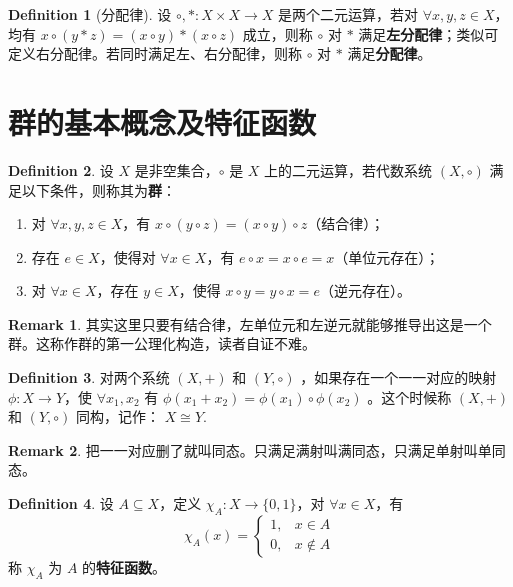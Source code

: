 \documentclass[oneside]{book}
\theoremstyle{definition}
\newtheorem{definition}{Definition}[section]
\newtheorem{remark}{Remark}[section]
\begin{document}
	\begin{definition}[分配律]
		设 \( \circ, *: X \times X \to X \) 是两个二元运算，若对 \( \forall x, y, z \in X \)，均有 \( x \circ (y * z) = (x \circ y) * (x \circ z) \) 成立，则称 \( \circ \) 对 \( * \) 满足\textbf{左分配律}；类似可定义右分配律。若同时满足左、右分配律，则称 \( \circ \) 对 \( * \) 满足\textbf{分配律}。
	\end{definition}
	
	\section{群的基本概念及特征函数}
	
	\begin{definition}
		设 \( X \) 是非空集合，\( \circ \) 是 \( X \) 上的二元运算，若代数系统 \( (X, \circ) \) 满足以下条件，则称其为\textbf{群}：
		\begin{enumerate}
			\item 对 \( \forall x, y, z \in X \)，有 \( x \circ (y \circ z) = (x \circ y) \circ z \)（结合律）；
			\item 存在 \( e \in X \)，使得对 \( \forall x \in X \)，有 \( e \circ x = x \circ e = x \)（单位元存在）；
			\item 对 \( \forall x \in X \)，存在 \( y \in X \)，使得 \( x \circ y = y \circ x = e \)（逆元存在）。
		\end{enumerate}
	\end{definition}
	\begin{remark}
		其实这里只要有结合律，左单位元和左逆元就能够推导出这是一个群。这称作群的第一公理化构造，读者自证不难。
	\end{remark}
	\begin{definition}
		
		对两个系统 \( (X,+)\) 和 \( (Y,\circ)\) ，如果存在一个一一对应的映射 \( \phi:X\rightarrow Y \)，使 \( \forall x_1,x_2 \) 有 \( \phi(x_1+x_2)=\phi(x_1)\circ \phi(x_2)\) 。这个时候称 \( (X,+)\) 和 \( (Y,\circ)\) 同构，记作： \( X \cong Y\). 
	\end{definition}
	\begin{remark}
		把一一对应删了就叫同态。只满足满射叫满同态，只满足单射叫单同态。
	\end{remark}
	\begin{definition}
		设 \( A \subseteq X \)，定义 \( \chi_A: X \to \{ 0, 1 \} \)，对 \( \forall x \in X \)，有
		\[
		\chi_A(x) =
		\begin{cases}
			1, & x \in A \\
			0, & x \notin A
		\end{cases}
		\]
		称 \( \chi_A \) 为 \( A \) 的\textbf{特征函数}。
	\end{definition}
	
\end{document}
